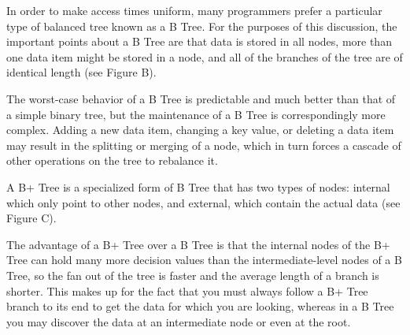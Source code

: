 In order to make access times uniform, many programmers prefer a particular
type of balanced tree known as a B Tree.  For the purposes of this
discussion, the important points about a B Tree are that data is stored in
all nodes, more than one data item might be stored in a node, and all of the
branches of the tree are of identical length (see Figure B).
 
The worst-case behavior of a B Tree is predictable and much better than that
of a simple binary tree, but the maintenance of a B Tree is correspondingly
more complex.  Adding a new data item, changing a key value, or deleting a
data item may result in the splitting or merging of a node, which in turn
forces a cascade of other operations on the tree to rebalance it.
 
A B+ Tree is a specialized form of B Tree that has two types of nodes:
internal which only point to other nodes, and external, which contain the
actual data (see Figure C).
 
The advantage of a B+ Tree over a B  Tree is that the internal nodes of the
B+ Tree can hold many more decision values than the intermediate-level nodes
of a B Tree, so the fan out of the tree is faster and the average length of a
branch is shorter.  This makes up for the fact that you must always follow a
B+ Tree branch to its end to get the data for which you are looking, whereas
in a B Tree you may discover the data at an intermediate node or even at the
root.
 

